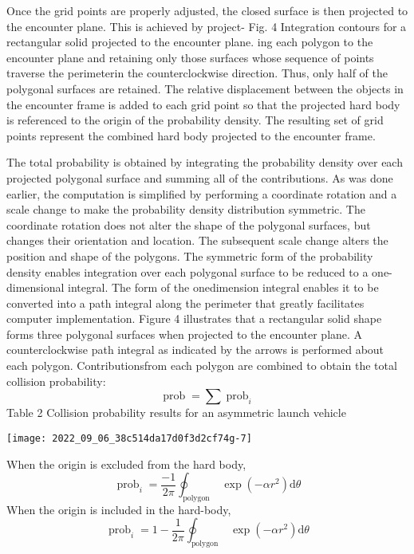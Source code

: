 \documentclass[10pt]{article}
\begin{document}
Once the grid points are properly adjusted, the closed surface is then projected to the encounter plane. This is achieved by project- Fig. 4 Integration contours for a rectangular solid projected to the encounter plane. ing each polygon to the encounter plane and retaining only those surfaces whose sequence of points traverse the perimeterin the counterclockwise direction. Thus, only half of the polygonal surfaces are retained. The relative displacement between the objects in the encounter frame is added to each grid point so that the projected hard body is referenced to the origin of the probability density. The resulting set of grid points represent the combined hard body projected to the encounter frame.

The total probability is obtained by integrating the probability density over each projected polygonal surface and summing all of the contributions. As was done earlier, the computation is simplified by performing a coordinate rotation and a scale change to make the probability density distribution symmetric. The coordinate rotation does not alter the shape of the polygonal surfaces, but changes their orientation and location. The subsequent scale change alters the position and shape of the polygons. The symmetric form of the probability density enables integration over each polygonal surface to be reduced to a one-dimensional integral. The form of the onedimension integral enables it to be converted into a path integral along the perimeter that greatly facilitates computer implementation. Figure 4 illustrates that a rectangular solid shape forms three polygonal surfaces when projected to the encounter plane. A counterclockwise path integral as indicated by the arrows is performed about each polygon. Contributionsfrom each polygon are combined to obtain the total collision probability:
$$
\operatorname{prob}=\sum \operatorname{prob}_{i}
$$
Table 2 Collision probability results for an asymmetric launch vehicle

\texttt{[image: 2022\_09\_06\_38c514da17d0f3d2cf74g-7]}

When the origin is excluded from the hard body,
$$
\operatorname{prob}_{i}=\frac{-1}{2 \pi} \oint_{\text {polygon }} \exp \left(-\alpha r^{2}\right) \mathrm{d} \theta
$$
When the origin is included in the hard-body,
$$
\operatorname{prob}_{i}=1-\frac{1}{2 \pi} \oint_{\text {polygon }} \exp \left(-\alpha r^{2}\right) \mathrm{d} \theta
$$
\end{document}
